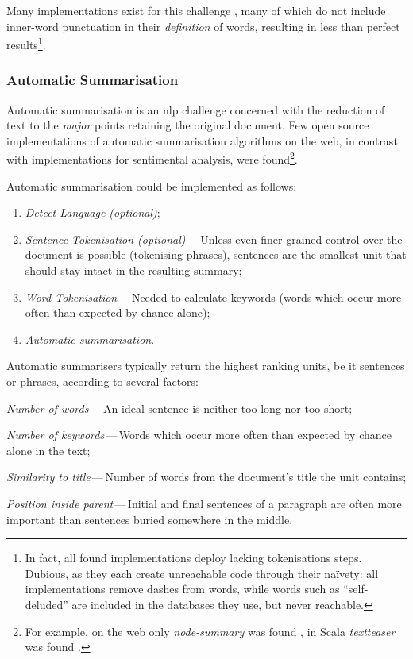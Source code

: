 Many implementations exist for this challenge
  \autocites{thinkroth/sentimental-source-code}{mileszim/sediment-source-code}
  {thisandagain/sentiment-source-code}, many of which do not include
  inner-word punctuation in their \emph{definition} of words, resulting in
  less than perfect results\footnote{In fact, all found implementations
      deploy lacking tokenisations steps.
    Dubious, as they each create unreachable code through their na\"ivety:
      all implementations remove dashes from words, while words such as
      ``self-deluded'' are included in the databases they use, but never
      reachable.}.

\subsubsection{Automatic Summarisation}\label{automatic-summarisation}

Automatic summarisation is an \gls{nlp} challenge concerned with the reduction
  of text to the \emph{major} points retaining the original document.
Few open source implementations of automatic summarisation algorithms on
  the web, in contrast with implementations for sentimental analysis, were
  found\footnote{For example, on the web only \emph{node-summary} was found
    \autocite{jbrooksuk/node-summary-source-code}, in Scala \emph{textteaser}
    was found \autocite{MojoJolo/textteaser-source-code}.}.

Automatic summarisation could be implemented as follows:

\begin{enumerate}
\item\emph{Detect Language (optional)};
\item\emph{Sentence Tokenisation (optional)}\,---\,Unless even finer grained
  control over the document is possible (tokenising phrases), sentences are
  the smallest unit that should stay intact in the resulting summary;
\item\emph{Word Tokenisation}\,---\,Needed to calculate keywords (words
  which occur more often than expected by chance alone);
\item\emph{Automatic summarisation}.
\end{enumerate}

\noindent Automatic summarisers typically return the highest ranking units,
  be it sentences or phrases, according to several factors:

\begin{aenumerate}
\item\emph{Number of words}\,---\,An ideal sentence is neither too long nor
  too short;
\item\emph{Number of keywords}\,---\,Words which occur more often than
  expected by chance alone in the text;
\item\emph{Similarity to title}\,---\,Number of words from the document's
  title the unit contains;
\item\emph{Position inside parent}\,---\,Initial and final sentences of a
  paragraph are often more important than sentences buried somewhere in
  the middle.
\end{aenumerate}

